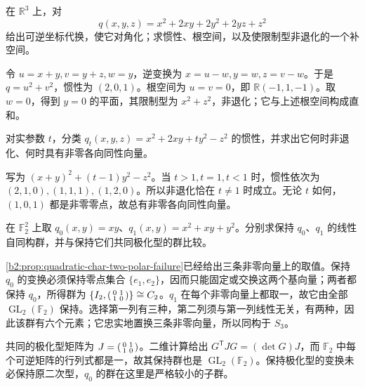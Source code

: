 \begin{exercise}\label{b2:ex:10-diagonalization-radical}
	在 \(\mathbb R^3\) 上，对
	\[
		q(x,y,z)=x^2+2xy+2y^2+2yz+z^2
	\]
	给出可逆坐标代换，使它对角化；求惯性、根空间，以及使限制型非退化的一个补空间。
\end{exercise}
\begin{solution}
	令 \(u=x+y,v=y+z,w=y\)，逆变换为 \(x=u-w,y=w,z=v-w\)。于是 \(q=u^2+v^2\)，惯性为 \((2,0,1)\)。根空间为 \(u=v=0\)，即 \(\mathbb R(-1,1,-1)\)。取 \(w=0\)，得到 \(y=0\) 的平面，其限制型为 \(x^2+z^2\)，非退化；它与上述根空间构成直和。
\end{solution}

\begin{exercise}\label{b2:ex:10-inertia-parameter}
	对实参数 \(t\)，分类 \(q_t(x,y,z)=x^2+2xy+ty^2-z^2\) 的惯性，并求出它何时非退化、何时具有非零各向同性向量。
\end{exercise}
\begin{solution}
	写为 \((x+y)^2+(t-1)y^2-z^2\)。当 \(t>1,t=1,t<1\) 时，惯性依次为 \((2,1,0),(1,1,1),(1,2,0)\)。所以非退化恰在 \(t\ne1\) 时成立。无论 \(t\) 如何，\((1,0,1)\) 都是非零零点，故总有非零各向同性向量。
\end{solution}

\begin{exercise}\label{b2:ex:10-char-two-same-polar}
	在 \(\mathbb F_2^2\) 上取 \(q_0(x,y)=xy\)、\(q_1(x,y)=x^2+xy+y^2\)。分别求保持 \(q_0\)、\(q_1\) 的线性自同构群，并与保持它们共同极化型的群比较。
\end{exercise}
\begin{solution}
	\cref{b2:prop:quadratic-char-two-polar-failure}已经给出三条非零向量上的取值。保持 \(q_0\) 的变换必须保持零点集合 \(\{e_1,e_2\}\)，因而只能固定或交换这两个基向量；两者都保持 \(q_0\)，所得群为 \(\{I_2,\begin{psmallmatrix}0&1\\1&0\end{psmallmatrix}\}\cong C_2\)。\(q_1\) 在每个非零向量上都取一，故它由全部 \(\operatorname{GL}_2(\mathbb F_2)\) 保持。选择第一列有三种，第二列须与第一列线性无关，有两种，因此该群有六个元素；它忠实地置换三条非零向量，所以同构于 \(S_3\)。

	共同的极化型矩阵为 \(J=\begin{psmallmatrix}0&1\\1&0\end{psmallmatrix}\)。二维计算给出 \(G^{\mathsf T}JG=(\det G)J\)，而 \(\mathbb F_2\) 中每个可逆矩阵的行列式都是一，故其保持群也是 \(\operatorname{GL}_2(\mathbb F_2)\)。保持极化型的变换未必保持原二次型，\(q_0\) 的群在这里是严格较小的子群。
\end{solution}

